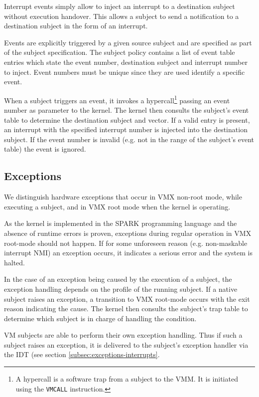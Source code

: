 Interrupt events simply allow to inject an interrupt to a destination subject
without execution handover. This allows a subject to send a notification to a
destination subject in the form of an interrupt.

Events are explicitly triggered by a given source subject and are specified as
part of the subject specification. The subject policy contains a list of event
table entries which state the event number, destination subject and interrupt
number to inject. Event numbers must be unique since they are used identify a
specific event.

When a subject triggers an event, it invokes a hypercall\footnote{A hypercall is
a software trap from a subject to the VMM. It is initiated using the
\texttt{VMCALL} instruction.} passing an event number as parameter to the
kernel. The kernel then consults the subject's event table to determine the
destination subject and vector. If a valid entry is present, an interrupt with
the specified interrupt number is injected into the destination subject. If the
event number is invalid (e.g. not in the range of the subject's event table) the
event is ignored.

\subsection{Exceptions}\label{subsec:design-exceptions}
We distinguish hardware exceptions that occur in VMX non-root mode, while
executing a subject, and in VMX root mode when the kernel is operating.

As the kernel is implemented in the SPARK programming language and the absence
of runtime errors is proven, exceptions during regular operation in VMX
root-mode should not happen. If for some unforeseen reason (e.g. non-maskable
interrupt NMI) an exception occurs, it indicates a serious error and the system
is halted.

In the case of an exception being caused by the execution of a subject, the
exception handling depends on the profile of the running subject. If a native
subject raises an exception, a transition to VMX root-mode occurs with the exit
reason indicating the cause. The kernel then consults the subject's trap table
to determine which subject is in charge of handling the condition.

VM subjects are able to perform their own exception handling. Thus if such a
subject raises an exception, it is delivered to the subject's exception handler
via the IDT (see section \ref{subsec:exceptions-interrupts}.

